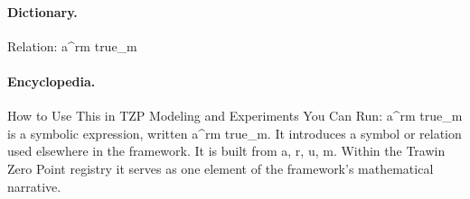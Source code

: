 \paragraph{Dictionary.}
Relation: a\textasciicircum{}rm true\_m

\paragraph{Encyclopedia.}
How to Use This in TZP Modeling and Experiments You Can Run: a\textasciicircum{}rm true\_m is a symbolic expression, written a\textasciicircum{}rm true\_m. It introduces a symbol or relation used elsewhere in the framework. It is built from a, r, u, m. Within the Trawin Zero Point registry it serves as one element of the framework's mathematical narrative.
